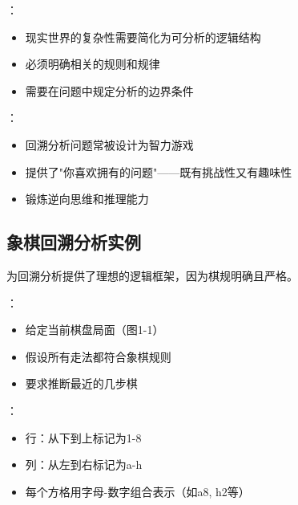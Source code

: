 \begin{theorembox}[title=回溯分析问题的特殊挑战]
：
\begin{itemize}
  \item 现实世界的复杂性需要简化为可分析的逻辑结构
  \item 必须明确相关的规则和规律
  \item 需要在问题中规定分析的边界条件
\end{itemize}

：
\begin{itemize}
  \item 回溯分析问题常被设计为智力游戏
  \item 提供了"你喜欢拥有的问题"——既有挑战性又有趣味性
  \item 锻炼逆向思维和推理能力
\end{itemize}
\end{theorembox}

\subsection{象棋回溯分析实例}

为回溯分析提供了理想的逻辑框架，因为棋规明确且严格。

\begin{examplebox}[title=象棋回溯分析问题]
：
\begin{itemize}
  \item 给定当前棋盘局面（图1-1）
  \item 假设所有走法都符合象棋规则
  \item 要求推断最近的几步棋
\end{itemize}

：
\begin{itemize}
  \item 行：从下到上标记为1-8
  \item 列：从左到右标记为a-h
  \item 每个方格用字母-数字组合表示（如a8, h2等）
\end{itemize}
\end{examplebox}

